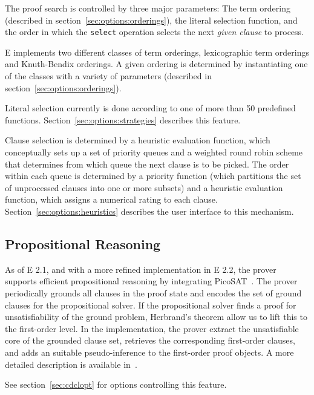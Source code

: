 \documentclass{report}
\begin{document}
The proof search is controlled by three major parameters: The term
ordering (described in section~\ref{sec:options:orderings}), the
literal selection function, and the order in which the \texttt{select}
operation selects the next \emph{given clause} to process.

E implements two different classes of term orderings, lexicographic term orderings and Knuth-Bendix
orderings. A given ordering is determined by instantiating one of the
classes with a variety of parameters (described in
section~\ref{sec:options:orderings}).

Literal selection currently is done according
to one of more than 50 predefined
functions. Section~\ref{sec:options:strategies} describes this
feature.

Clause selection is determined by a heuristic evaluation function,
which conceptually sets up a set of priority queues and a weighted
round robin scheme that determines from which queue the next clause is
to be picked. The order within each queue is determined by a priority
function (which partitions the set of unprocessed clauses into one or
more subsets) and a heuristic evaluation function, which assigns a
numerical rating to each clause.  Section~\ref{sec:options:heuristics}
describes the user interface to this mechanism.


\subsection{Propositional Reasoning}
\label{sec:cdcl}

As of E 2.1, and with a more refined implementation in E 2.2, the
prover supports efficient propositional reasoning by integrating
PicoSAT~\cite{Biere:JSBC-2008}. The prover periodically
grounds all clauses in the proof state and encodes the set of ground
clauses for the propositional solver. If the propositional solver
finds a proof for unsatisfiability of the ground problem, Herbrand's
theorem allow us to lift this to the first-order level. In the
implementation, the prover extract the unsatisfiable core of the
grounded clause set, retrieves the corresponding first-order clauses,
and adds an suitable pseudo-inference to the first-order proof
objects. A more detailed description is available
in~\cite{Schulz:Vampire-2018}.

See section~\ref{sec:cdclopt} for options controlling this feature.
\end{document}
